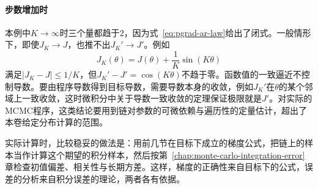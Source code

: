 \paragraph{步数增加时}

本例中$K\to\infty$时三个量都趋于$2$，因为式~\eqref{eq:pgrad-ar-law}给出了闭式。一般情形下，即使$J_{K}\to J$，也推不出$J_{K}'\to J'$。例如
\[
  J_{K}(\theta)=J(\theta)+\frac{1}{K}\sin(K\theta)
\]
满足$\lvert J_{K}-J\rvert\leq1/K$，但$J_{K}'-J'=\cos(K\theta)$不趋于零。函数值的一致逼近不控制导数。要由程序导数得到目标导数，需要导数本身的收敛，例如$J_{K}'$在$\theta$的某个邻域上一致收敛，这时微积分中关于导数一致收敛的定理保证极限就是$J'$。对实际的MCMC程序，这类结论要用到链对参数的可微依赖与遍历性的定量估计，超出了本卷给定分布计算的范围。

实际计算时，比较稳妥的做法是：用前几节在目标下成立的梯度公式，把链上的样本当作计算这个期望的积分样本，然后按第~\ref{chap:monte-carlo-integration-error}章检查初值偏差、相关性与长期方差。这样，梯度的正确性来自目标下的公式，误差的分析来自积分误差的理论，两者各有依据。
